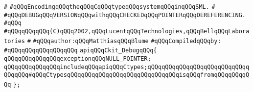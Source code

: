 \label{src/lib/c-glue-lib/c-debug.api}
\verb|#|\newline
\verb|#qQQqEncodingqQQqtheqQQqCqQQqtypeqQQqsystemqQQqinqQQqSML.|\newline
\verb|#|\newline
\verb|#qQQqDEBUGqQQqVERSIONqQQqwithqQQqCHECKEDqQQqPOINTERqQQqDEREFERENCING.|\newline
\verb|#qQQq|\newline
\verb|#qQQqqQQqqQQq(C)qQQq2002,qQQqLucentqQQqTechnologies,qQQqBellqQQqLaboratories|\newline
\verb|#|\newline
\verb|#qQQqauthor:qQQqMatthiasqQQqBlume|\newline
\newline
\verb|#qQQqCompiledqQQqby:|\newline
\verb|#qQQqqQQqqQQqqQQqqQQq|\newline
\newline
\verb|apiqQQqCkit_DebugqQQq{|\newline
\verb|qQQqqQQqqQQqqQQqexceptionqQQqNULL_POINTER;|\newline
\verb|qQQqqQQqqQQqqQQqincludeqQQqapiqQQqCtypes;qQQqqQQqqQQqqQQqqQQqqQQqqQQqqQQqqQQq#qQQqCtypesqQQqqQQqqQQqqQQqqQQqqQQqqQQqqQQqisqQQqfromqQQqqQQqqQQq|\newline
\verb|};|\newline

